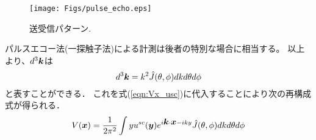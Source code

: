\documentclass[10pt,a4j,dvipdfmx]{jarticle}
\begin{document}
\begin{figure}[h]
	\begin{center}
	\texttt{[image: Figs/pulse\_echo.eps]} 
	\end{center}
	\caption{送受信パターン.} 
	\label{fig:}
\end{figure}
パルスエコー法(一探触子法)による計測は後者の特別な場合に相当する。
以上より、$d^3\mbox{\boldmath $k$}$は
\begin{equation}
	d^3\mbox{\boldmath $k$}=k^2\hat{J}(\theta,\phi) dkd\theta d\phi
	\label{eqn:}
\end{equation}
と表すことができる．
これを式(\ref{eqn:Vx_usc})に代入することにより次の再構成式が得られる．
\begin{equation}
	V(\mbox{\boldmath $x$}) =\frac{1}{2\pi^2} \int yu^{sc}(\mbox{\boldmath $y$})
	e^{i\mbox{\boldmath $k$}\cdot \mbox{\boldmath $x$}-iky}
	\hat{J}(\theta,\phi) dkd\theta d\phi
	\label{eqn:}
\end{equation}
\end{document}
